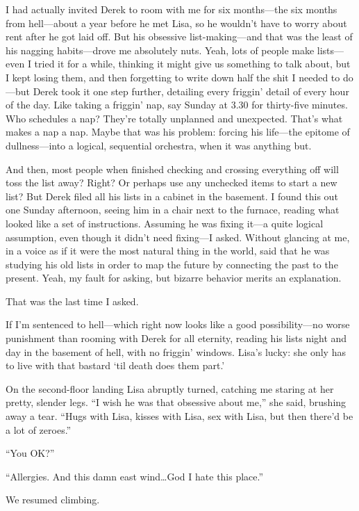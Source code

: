 I had actually invited Derek to room with me for six months---the six
months from hell---about a year before he met Lisa, so he wouldn't have
to worry about rent after he got laid off. But his obsessive
list-making---and that was the least of his nagging habits---drove me
absolutely nuts. Yeah, lots of people make lists---even I tried it for a
while, thinking it might give us something to talk about, but I kept
losing them, and then forgetting to write down half the shit I needed to
do---but Derek took it one step further, detailing every friggin' detail
of every hour of the day. Like taking a friggin' nap, say Sunday at 3.30
for thirty-five minutes. Who schedules a nap? They're totally unplanned
and unexpected. That's what makes a nap a nap. Maybe that was his
problem: forcing his life---the epitome of dullness---into a logical,
sequential orchestra, when it was anything but.

And then, most people when finished checking and crossing everything off
will toss the list away? Right? Or perhaps use any unchecked items to
start a new list? But Derek filed all his lists in a cabinet in the
basement. I found this out one Sunday afternoon, seeing him in a chair
next to the furnace, reading what looked like a set of instructions.
Assuming he was fixing it---a quite logical assumption, even though it
didn't need fixing---I asked. Without glancing at me, in a voice as if
it were the most natural thing in the world, said that he was studying
his old lists in order to map the future by connecting the past to the
present. Yeah, my fault for asking, but bizarre behavior merits an
explanation.

That was the last time I asked.

If I'm sentenced to hell---which right now looks like a good
possibility---no worse punishment than rooming with Derek for all
eternity, reading his lists night and day in the basement of hell, with
no friggin' windows. Lisa's lucky: she only has to live with that
bastard `til death does them part.'

On the second-floor landing Lisa abruptly turned, catching me staring at
her pretty, slender legs. ``I wish he was that obsessive about me,'' she
said, brushing away a tear. ``Hugs with Lisa, kisses with Lisa, sex with
Lisa, but then there'd be a lot of zeroes.''

``You OK?''

``Allergies. And this damn east wind\ldots God I hate this place.''

We resumed climbing.

